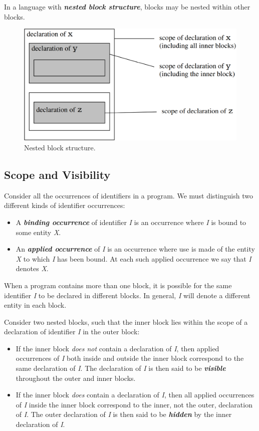 In a language with \textit{\textbf{nested block structure}}, blocks may be nested within other blocks.

\begin{figure}[H]
  \centering
  \includegraphics[width=\linewidth]{img/fig-4.3.png}
  \caption{Nested block structure.}
  \label{fig:fig3}
\end{figure}


\subsection{Scope and Visibility}

Consider all the occurrences of identifiers in a program. We must distinguish two different kinds of identifier occurrences:
\begin{itemize}
  \item A \textit{\textbf{binding occurrence}} of identifier \textit{I} is an occurrence where \textit{I} is bound to some entity \textit{X}.
  \item An \textit{\textbf{applied occurrence}} of \textit{I} is an occurrence where use is made of the entity \textit{X} to which \textit{I} has been bound. At each such applied occurrence we say that \textit{I} denotes \textit{X}.
\end{itemize}

When a program contains more than one block, it is possible for the same
identifier \textit{I} to be declared in different blocks. In general, \textit{I} will denote a different entity in each block.

Consider two nested blocks, such that the inner block lies within the scope of a declaration of identifier \textit{I} in the outer block:
\begin{itemize}
  \item If the inner block \textit{does not} contain a declaration of \textit{I}, then applied occurrences of \textit{I} both inside and outside the inner block correspond to the same declaration of \textit{I}. The declaration of \textit{I} is then said to be \textit{\textbf{visible}} throughout the outer and inner blocks.
  \item If the inner block \textit{does} contain a declaration of \textit{I}, then all applied occurrences of \textit{I} inside the inner block correspond to the inner, not the outer, declaration of \textit{I}. The outer declaration of \textit{I} is then said to be \textit{\textbf{hidden}} by the inner declaration of \textit{I}.
\end{itemize}

